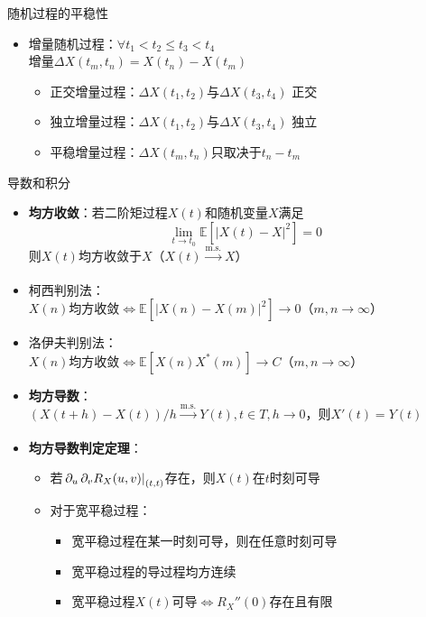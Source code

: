 \documentclass[landscape,a4paper]{ctexart}
\newcommand{\mean}[1]{\mathbb{E}\left[#1\right]}
\newcommand{\msconv}[1][]{\xrightarrow[#1]{\mathrm{m.s.}}}
\begin{document}
\begin{cheatsheetcolumns}
\begin{card}{随机过程的平稳性}
\begin{itemize}
\begin{itemize}
					\item 不相关：$\operatorname{Cov}(X,Y)=R_{XY}-\mean{X}\mean{Y^\ast}=0$
					\item 独立：
					$p_{X,Y}(x,y)=p_X(x)p_Y(y)$
					\item 独立必然不相关，反之不一定
				\end{itemize}
				\item 增量随机过程：$\forall t_1<t_2\le t_3 < t_4$\\增量$\Delta X(t_m, t_n)=X(t_n)-X(t_m)$
				\begin{itemize}
					\item 正交增量过程：$\Delta X(t_1, t_2)$与$\Delta X(t_3, t_4)$ 正交
					\item 独立增量过程：$\Delta X(t_1, t_2)$与$\Delta X(t_3, t_4)$ 独立
					\item 平稳增量过程：$\Delta X(t_m, t_n)$只取决于$t_n-t_m$
				\end{itemize}
			\end{itemize}
		\end{card}
		\begin{card}{导数和积分}
			\begin{itemize}
				\item \textbf{均方收敛}：若二阶矩过程$X(t)$和随机变量$X$满足\[\lim_{t\to t_0}\mean{\left| X(t)-X\right|^2}=0\]则$X(t)$均方收敛于$X$（$X(t)\msconv X$）
				\item 柯西判别法：\\$X(n)$均方收敛$\Leftrightarrow\mean{\left|X(n)-X(m)\right|^2}\to 0$\hfill（$m,n\to \infty$）\\
				\item 洛伊夫判别法：\\$X(n)$均方收敛$\Leftrightarrow\mean{X(n)X^\ast(m)}\to C$\hfill（$m,n\to \infty$）
				\item \textbf{均方导数}：\\$\left(X(t+h)-X(t)\right)/h\msconv Y(t), t\in T, h\to 0$，则$X'(t)=Y(t)$
				\item \textbf{均方导数判定定理}：
				\begin{itemize}
					\item 若$\left.\pdv{R_X}!{u,v}(u, v)\right|_{(t, t)}$存在，则$X(t)$在$t$时刻可导
					\item 对于宽平稳过程：
					\begin{itemize}
						\item 宽平稳过程在某一时刻可导，则在任意时刻可导
						\item 宽平稳过程的导过程均方连续
						\item 宽平稳过程$X(t)$可导$\Leftrightarrow R_X''(0)$存在且有限

\end{itemize}
\end{itemize}
\end{itemize}
\end{card}
\end{cheatsheetcolumns}
\end{document}
